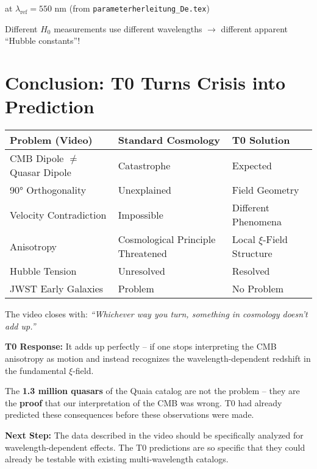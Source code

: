 \documentclass{article}
\begin{document}
	at $\lambda_{\text{ref}} = 550$ nm (from \texttt{parameterherleitung\_De.tex})
	
	Different $H_0$ measurements use different wavelengths $\rightarrow$ different apparent ``Hubble constants''!
	
	\section{Conclusion: T0 Turns Crisis into Prediction}
	
	\begin{tabular}{p{4.5cm}|p{4.5cm}|p{4.5cm}}
		\textbf{Problem (Video)} & \textbf{Standard Cosmology} & \textbf{T0 Solution} \\
		\hline
		CMB Dipole $\neq$ Quasar Dipole & Catastrophe \cite{mittal2023} & Expected \\
		90° Orthogonality & Unexplained \cite{secrest2024} & Field Geometry \\
		Velocity Contradiction & Impossible & Different Phenomena \\
		Anisotropy & Cosmological Principle Threatened & Local $\xi$-Field Structure \\
		Hubble Tension & Unresolved & Resolved \\
		JWST Early Galaxies & Problem & No Problem \\
	\end{tabular}
	
	The video closes with: \textit{``Whichever way you turn, something in cosmology doesn't add up.''}
	
	\textbf{T0 Response:} It adds up perfectly -- if one stops interpreting the CMB anisotropy as motion and instead recognizes the wavelength-dependent redshift in the fundamental $\xi$-field.
	
	The \textbf{1.3 million quasars} of the Quaia catalog are not the problem -- they are the \textbf{proof} that our interpretation of the CMB was wrong. T0 had already predicted these consequences before these observations were made.
	
	\textbf{Next Step:} The data described in the video should be specifically analyzed for wavelength-dependent effects. The T0 predictions are so specific that they could already be testable with existing multi-wavelength catalogs.
	
\end{document}
